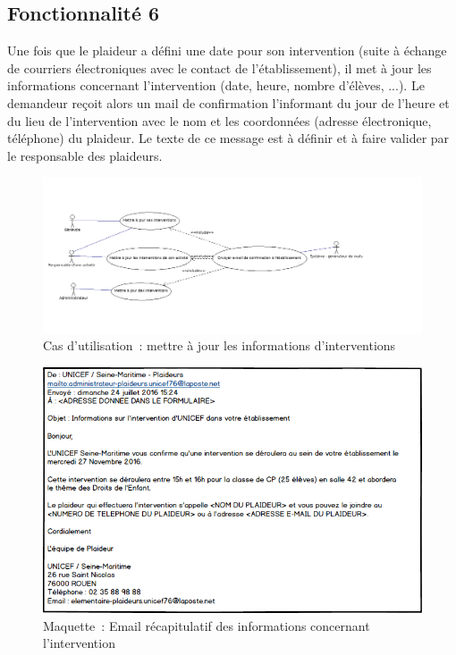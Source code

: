 \subsection{Fonctionnalité 6}
Une fois que le plaideur a défini une date pour son intervention (suite à échange de courriers électroniques avec le contact de l'établissement), il met à jour les informations concernant l'intervention (date, heure, nombre d'élèves, ...). Le demandeur reçoit alors un mail de confirmation l'informant du jour de l'heure et du lieu de l'intervention avec le nom et les coordonnées (adresse électronique, téléphone) du plaideur. Le texte de ce message est à définir et à faire valider par le responsable des plaideurs. \\

\begin{figure}[H]
	\centering
	\includegraphics[scale=0.4]{images/casDUtilisation/fonctionnalite6MiseAJourIntervention.png}
	 \caption{Cas d'utilisation~: mettre à jour les informations d'interventions}
	 \label{mettreAJourInterventions}
\end{figure}


\begin{figure}[H]
	\centering
	\includegraphics[scale=0.7]{images/maquettes/fonctionnalite6MailDInformationPourLEtablissement.png}
	\caption{Maquette~: Email récapitulatif des informations concernant l'intervention}
\end{figure}
